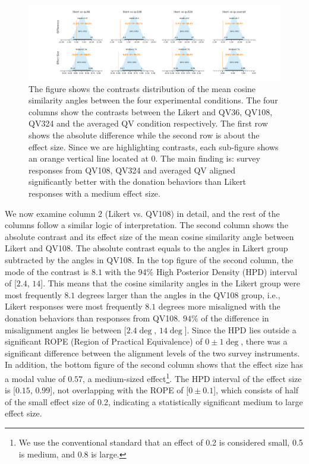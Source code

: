 \begin{figure}[htpb]
  \centering
  \includegraphics[trim= 2in 0in 2in 0in, clip, width=\textwidth, keepaspectratio=true]{"content/image/Votes_vs_Absolute_Donation_StudentT_differences_and_effects.pdf"}
  \caption{
    The figure shows the contrasts distribution of the mean cosine similarity angles between the four experimental conditions. The four columns show the contrasts between the Likert and QV36, QV108, QV324 and the averaged QV condition respectively. The first row shows the absolute difference while the second row is about the effect size. Since we are highlighting contrasts, each sub-figure shows an orange vertical line located at 0. The main finding is: survey responses from QV108, QV324 and averaged QV aligned significantly better with the donation behaviors than Likert responses with a medium effect size.
  }
  \label{fig:contrast_exp1}
\end{figure}

We now examine column $2$ (Likert vs. QV108) in detail, and the rest of the columns follow a similar logic of interpretation. The second column shows the absolute contrast and its effect size of the mean cosine similarity angle between Likert and QV108. The absolute contrast equals to the angles in Likert group subtracted by the angles in QV108. In the top figure of the second column, the mode of the contrast is $8.1$ with the 94\% High Posterior Density (HPD) interval of [$2.4$, $14$]. This means that the cosine similarity angles in the Likert group were most frequently $8.1$ degrees larger than the angles in the QV108 group, i.e., Likert responses were most frequently $8.1$ degrees more misaligned with the donation behaviors than responses from QV108. $94\%$ of the difference in misalignment angles lie between [$2.4 \deg$, $14 \deg$]. Since the HPD lies outside a significant ROPE (Region of Practical Equivalence) of $0 \pm 1 \deg$, there was a significant difference between the alignment levels of the two survey instruments. In addition, the bottom figure of the second column shows that the effect size has a modal value of $0.57$, a medium-sized effect\footnote{We use the conventional standard that an effect of 0.2 is considered small, 0.5 is medium, and 0.8 is large.}. The HPD interval of the effect size is [$0.15$, $0.99$], not overlapping with the ROPE of [$0 \pm 0.1$], which consists of half of the small effect size of 0.2, indicating a statistically significant medium to large effect size.

